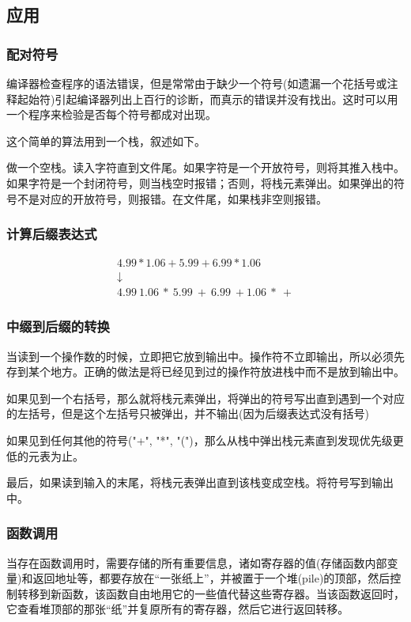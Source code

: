 \documentclass[utf8]{ctexbook}
\begin{document}
\subsection{应用}
\subsubsection{配对符号}
编译器检查程序的语法错误，但是常常由于缺少一个符号(如遗漏一个花括号或注释起始符)引起编译器列出上百行的诊断，而真示的错误并没有找出。这时可以用一个程序来检验是否每个符号都成对出现。

这个简单的算法用到一个栈，叙述如下。

{\kaishu \qquad 做一个空栈。读入字符直到文件尾。如果字符是一个开放符号，则将其推入栈中。如果字符是一个封闭符号，则当栈空时报错；否则，将栈元素弹出。如果弹出的符号不是对应的开放符号，则报错。在文件尾，如果栈非空则报错。}

\subsubsection{计算后缀表达式}
\begin{gather*}
4.99*1.06 + 5.99 + 6.99*1.06\\
\downarrow\\
4.99\ 1.06\ *\ 5.99\ +\ 6.99\ +1.06\ *\ +
\end{gather*}
\subsubsection{中缀到后缀的转换}
当读到一个操作数的时候，立即把它放到输出中。操作符不立即输出，所以必须先存到某个地方。正确的做法是将已经见到过的操作符放进栈中而不是放到输出中。

如果见到一个右括号，那么就将栈元素弹出，将弹出的符号写出直到遇到一个对应的左括号，但是这个左括号只被弹出，并不输出(因为后缀表达式没有括号)

如果见到任何其他的符号("+", "*", "(")，那么从栈中弹出栈元素直到发现优先级更低的元表为止。

最后，如果读到输入的末尾，将栈元表弹出直到该栈变成空栈。将符号写到输出中。
\subsubsection{函数调用}
当存在函数调用时，需要存储的所有重要信息，诸如寄存器的值(存储函数内部变量)和返回地址等，都要存放在“一张纸上”，并被置于一个堆(pile)的顶部，然后控制转移到新函数，该函数自由地用它的一些值代替这些寄存器。当该函数返回时，它查看堆顶部的那张“纸”并复原所有的寄存器，然后它进行返回转移。
\end{document}
